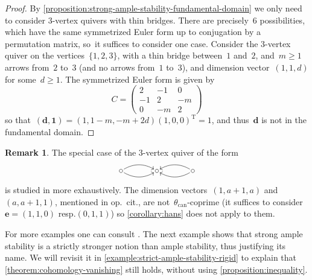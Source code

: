 \documentclass[11pt]{article}
\newcommand{\resp}{resp.\xspace}
\theoremstyle{plain}
\theoremstyle{definition}
\newtheorem{remark}[theorem]{Remark}
\newcommand\can{\ensuremath{\mathrm{can}}}
\newcommand\tuple[1]{\ensuremath{{\boldsymbol{#1}}}}
\begin{document}
\begin{proof}
By \cref{proposition:strong-ample-stability-fundamental-domain}
we only need to consider $3$-vertex quivers with thin bridges.
There are precisely~6 possibilities,
which have the same symmetrized Euler form up to conjugation by a permutation matrix, so~it suffices to consider one case.
Consider the $3$-vertex quiver on the vertices~$\{1,2,3\}$,
with a thin bridge between~$1$ and~$2$,
and~$m\geq 1$ arrows from~$2$ to~$3$
(and no arrows from~$1$ to~$3$),
and dimension vector~$(1,1,d)$ for some~$d\geq 1$.
The symmetrized Euler form is given by
\begin{equation*}
C=
\begin{pmatrix}
2 & -1 & 0 \\
-1 & 2 & -m \\
0 & -m & 2
\end{pmatrix}
\end{equation*}
so that~$(\tuple{d},\mathbf{1})=(1,1-m,-m+2d)(1,0,0)^{\mathrm{T}}=1$,
and thus~$\tuple{d}$ is not in the fundamental domain.
\end{proof}

\begin{remark}
The special case of the $3$-vertex quiver of the form
\begin{equation}
\begin{tikzpicture}[baseline = -3pt, node distance = 1.5cm]
\node (1) {};
\node (2) [right of = 1] {};
\node (3) [right of = 2] {};
\draw (1) circle (2pt);
\draw (2) circle (2pt);
\draw (3) circle (2pt);
\draw[->, bend left = 30] (1) edge (2);
\draw[->, bend right = 30] (1) edge (2);
\draw[->, bend left = 30] (3) edge (2);
\draw[->, bend right = 30] (3) edge (2);
\end{tikzpicture}
\end{equation}
is studied in \cite[Th.\,3.3.2]{karen}
more exhaustively.
The dimension vectors~$(1,a+1,a)$ and~$(a,a+1,1)$,
mentioned in op.~cit.,
are not~$\theta_\can$-coprime
(it suffices to consider~$\tuple{e}=(1,1,0)$ \resp $(0,1,1)$)
so \cref{corollary:hans} does not apply to them.
\end{remark}

For more examples one can consult \cite[\S3]{karen}.
The next example shows that strong ample stability
is a strictly stronger notion than ample stability, thus justifying its name.
We will revisit it in \cref{example:strict-ample-stability-rigid}
to explain that \cref{theorem:cohomology-vanishing} still holds,
without using \cref{proposition:inequality}.
\end{document}
